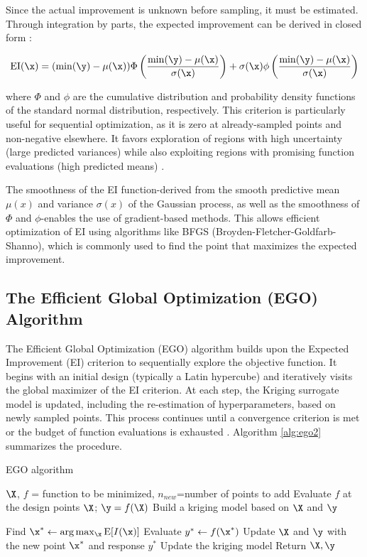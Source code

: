 \documentclass [PhD] {package/uclathes}
\begin{document}
Since the actual improvement is unknown before sampling, it must be estimated. Through integration by parts, the expected improvement can be derived in closed form \parencite{jones1998efficient}:

\[
\mathrm{EI}(\x) = (\min (\y)-\mu(\x)) \Phi\left(\frac{\min (\y)-\mu(\x)}{\sigma(\x)}\right)+\sigma(\x) \phi\left(\frac{\min (\y)-\mu(\x)}{\sigma(\x)}\right)
\]

where \(\Phi\) and \(\phi\) are the cumulative distribution and probability density functions of the standard normal distribution, respectively. This criterion is particularly useful for sequential optimization, as it is zero at already-sampled points and non-negative elsewhere. It favors exploration of regions with high uncertainty (large predicted variances) while also exploiting regions with promising function evaluations (high predicted means) \parencite{jones1998efficient}.

The smoothness of the EI function-derived from the smooth predictive mean \(\mu(x)\) and variance \(\sigma(x)\) of the Gaussian process, as well as the smoothness of \(\Phi\) and \(\phi\)-enables the use of gradient-based methods. This allows efficient optimization of EI using algorithms like BFGS (Broyden-Fletcher-Goldfarb-Shanno), which is commonly used to find the point that maximizes the expected improvement.
\fi%

\subsection{The Efficient Global Optimization (EGO) Algorithm}

The Efficient Global Optimization (EGO) algorithm builds upon the Expected Improvement (EI) criterion to sequentially explore the objective function. It begins with an initial design (typically a Latin hypercube) and iteratively visits the global maximizer of the EI criterion. At each step, the Kriging surrogate model is updated, including the re-estimation of hyperparameters, based on newly sampled points. This process continues until a convergence criterion is met or the budget of function evaluations is exhausted \parencite{roustant2012dicekriging}. Algorithm \ref{alg:ego2} summarizes the procedure.

\begin{algorithm}%
    \caption{EGO algorithm}\label{alg:ego2}
    \begin{algorithmic}[1]
        \Require $\X$, $f$ = function to be minimized, $n_{new}$=number of points to add
        \State Evaluate $f$ at the design points $\X$; $\y=f(\X)$
        \State Build a kriging model based on $\X$ and $\y$

        \State Find $\x^* \gets \arg\max_{\x}\mathrm{E}[I(\x)]$
        \State Evaluate $y^* \gets f(\x^*)$
        \State Update $\X$ and $\y$ with the new point $\x^*$ and response $y^*$
        \State Update the kriging model
\EndFor
\State Return $\X, \y$
\end{algorithmic}
\end{algorithm}
\end{document}
